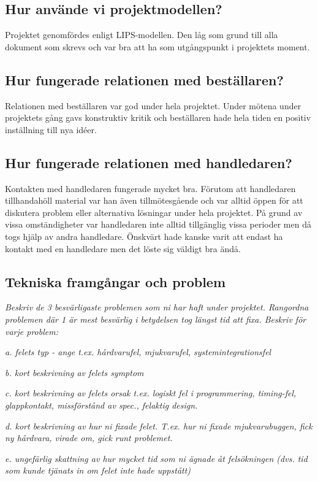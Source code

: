 \documentclass[11pt]{article}
\begin{document}
\subsection{Hur använde vi projektmodellen?} 
Projektet genomfördes enligt LIPS-modellen. Den låg som grund till alla dokument som skrevs och var bra att ha som utgångspunkt i projektets moment. 

\subsection{Hur fungerade relationen med beställaren?}
Relationen med beställaren var god under hela projektet. Under mötena under projektets gång gavs konstruktiv kritik och beställaren hade hela tiden en positiv inställning till nya idéer. 

\subsection{Hur fungerade relationen med handledaren?}
Kontakten med handledaren fungerade mycket bra. Förutom att handledaren tillhandahöll material var han även  tillmötesgående och var alltid öppen för att diskutera problem eller alternativa lösningar under hela projektet. På grund av vissa omständigheter var handledaren inte alltid tillgänglig vissa perioder men då togs hjälp av andra handledare. Önskvärt hade kanske varit att endast ha kontakt med en handledare men det löste sig väldigt bra ändå.

\subsection{Tekniska framgångar och problem}
\textit{Beskriv de 3 besvärligaste problemen som ni har haft under projektet. Rangordna problemen där 1 är mest besvärlig i betydelsen tog längst tid att fixa. Beskriv för varje problem: }

\textit{a. felets typ - ange t.ex.  hårdvarufel, mjukvarufel, systemintegrationsfel }

\textit{b. kort beskrivning av felets symptom }

\textit{c. kort beskrivning av felets orsak t.ex. logiskt fel i programmering, timing-fel, glappkontakt, missförstånd av spec., felaktig design. }

\textit{d. kort beskrivning av hur ni fixade felet. T.ex. hur ni fixade mjukvarubuggen, fick ny hårdvara, virade om, gick runt problemet. }

\textit{e. ungefärlig skattning av hur mycket tid som ni ägnade åt felsökningen (dvs. tid som kunde tjänats in om felet inte hade uppstått)}
\end{document}
